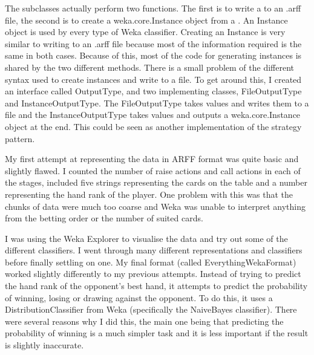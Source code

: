 The \wf subclasses actually perform two functions. The first is to write a \gr to an .arff file, the second is to create a weka.core.Instance object from a \gs. An Instance object is used by every type of Weka classifier. Creating an Instance is very similar to writing to an .arff file because most of the information required is the same in both cases. 
Because of this, most of the code for generating instances is shared by the two different methods. There is a small problem of the different syntax used to create instances and write to a file. To get around this, I created an interface called OutputType, and two implementing classes, FileOutputType and InstanceOutputType. The FileOutputType takes values and writes them to a file and the InstanceOutputType takes values and outputs a weka.core.Instance object at the end. This could be seen as another implementation of the strategy pattern. 

My first attempt at representing the data in ARFF format was quite basic and slightly flawed. I counted the number of raise actions and call actions in each of the stages, included five strings representing the cards on the table and a number representing the hand rank of the player. One problem with this was that the chunks of data were much too coarse and Weka was unable to interpret anything from the betting order or the number of suited cards. 

I was using the Weka Explorer to visualise the data and try out some of the different classifiers. I went through many different representations and classifiers before finally settling on one. My final format (called EverythingWekaFormat) worked slightly differently to my previous attempts. 
Instead of trying to predict the hand rank of the opponent's best hand, it attempts to predict the probability of winning, losing or drawing against the opponent. To do this, it uses a \mbox{DistributionClassifier} from Weka (specifically the NaiveBayes classifier). 
There were several reasons why I did this, the main one being that predicting the probability of winning is a much simpler task and it is less important if the result is slightly inaccurate.

